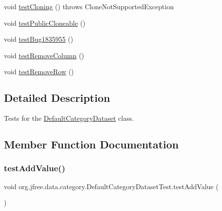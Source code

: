 \begin{DoxyCompactItemize}
\item 
void \mbox{\hyperlink{classorg_1_1jfree_1_1data_1_1category_1_1_default_category_dataset_test_a3dab86a8629dde377a1d672c258fb2e6}{test\+Cloning}} ()  throws Clone\+Not\+Supported\+Exception 
\item 
void \mbox{\hyperlink{classorg_1_1jfree_1_1data_1_1category_1_1_default_category_dataset_test_aede2c547bfdce33355c8a6a7c6c69f52}{test\+Public\+Cloneable}} ()
\item 
void \mbox{\hyperlink{classorg_1_1jfree_1_1data_1_1category_1_1_default_category_dataset_test_acee19f726f9978afbf5daa875f3f43ce}{test\+Bug1835955}} ()
\item 
void \mbox{\hyperlink{classorg_1_1jfree_1_1data_1_1category_1_1_default_category_dataset_test_a7556389d5573bbdc87d6324db271b196}{test\+Remove\+Column}} ()
\item 
void \mbox{\hyperlink{classorg_1_1jfree_1_1data_1_1category_1_1_default_category_dataset_test_a63a973502c4820019bdfbed7da02b0ec}{test\+Remove\+Row}} ()
\end{DoxyCompactItemize}


\subsection{Detailed Description}
Tests for the \mbox{\hyperlink{classorg_1_1jfree_1_1data_1_1category_1_1_default_category_dataset}{Default\+Category\+Dataset}} class. 

\subsection{Member Function Documentation}
\mbox{\label{classorg_1_1jfree_1_1data_1_1category_1_1_default_category_dataset_test_ab7204dde8cd689b1b8958775a96a7ad5}} 
\subsubsection{\texorpdfstring{test\+Add\+Value()}{testAddValue()}}
{\footnotesize\ttfamily void org.\+jfree.\+data.\+category.\+Default\+Category\+Dataset\+Test.\+test\+Add\+Value (\begin{DoxyParamCaption}{ }\end{DoxyParamCaption})}

